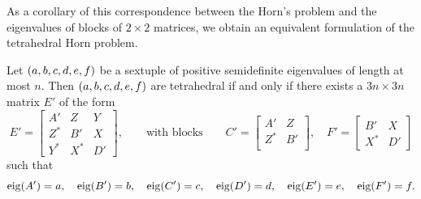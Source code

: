 \documentclass[notitlepage, 10pt]{article}
\begin{document}
As a corollary of this correspondence between the Horn's problem and the eigenvalues of blocks of $2\times 2$ matrices, we obtain an equivalent formulation of the tetrahedral Horn problem.
\begin{thm}
    \label{thm:tetrahedral_block}
    Let $(a,b,c,d,e,f)$ be a sextuple of positive semidefinite eigenvalues of length at most $n$.
    Then $(a,b,c,d,e,f)$ are tetrahedral if and only if there exists a $3n \times 3n$ matrix $E'$ of the form
    \begin{equation}
        \label{eq:block_3by3}
        E' =
        \begin{bmatrix}
            A' & Z & Y \\
            Z^{*} & B' & X\\
            Y^{*} & X^{*} & D'
        \end{bmatrix},
        \qquad \text{with blocks} \qquad
        C' = \begin{bmatrix}
            A' & Z \\
            Z^{*} & B'\\
        \end{bmatrix}, \quad
        F' = \begin{bmatrix}
            B' & X \\
            X^{*} & D'
        \end{bmatrix}
    \end{equation}
    such that
    \begin{equation}
        \label{eq:block_eigenvalue_tet}
        \operatorname{eig}(A') = a, \quad
        \operatorname{eig}(B') = b, \quad
        \operatorname{eig}(C') = c, \quad
        \operatorname{eig}(D') = d, \quad
        \operatorname{eig}(E') = e, \quad
        \operatorname{eig}(F') = f.
    \end{equation}
\end{thm}
\end{document}
